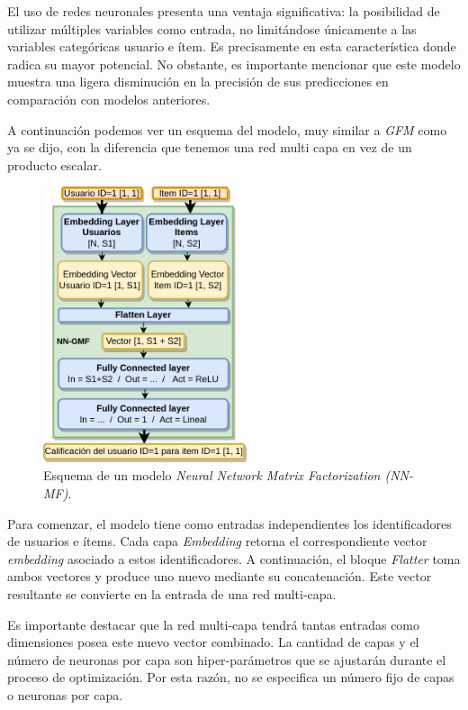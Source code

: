 \documentclass[11pt,a4paper,twoside]{thesis}
\begin{document}
El uso de redes neuronales presenta una ventaja significativa: la posibilidad
de utilizar múltiples variables como entrada, no limitándose únicamente a las
variables categóricas usuario e ítem. Es precisamente en esta característica
donde radica su mayor potencial. No obstante, es importante mencionar que este
modelo muestra una ligera disminución en la precisión de sus predicciones en
comparación con modelos anteriores.

A continuación podemos ver un esquema del modelo, muy similar a \textit{GFM}
como ya se dijo, con la diferencia que tenemos una red multi capa en vez de un
producto escalar.

\begin{figure}[h!]
	\centering
	\includegraphics[width=6cm]{./images/NN-MF.png}

	\caption{
		Esquema de un modelo \textit{Neural Network Matrix Factorization (NN-MF)}.
	}
	\label{fig:NNMFModel}
\end{figure}

Para comenzar, el modelo tiene como entradas independientes los identificadores
de usuarios e ítems. Cada capa \textit{Embedding} retorna el correspondiente
vector \textit{embedding} asociado a estos identificadores. A continuación, el
bloque \textit{Flatter} toma ambos vectores y produce uno nuevo mediante su
concatenación. Este vector resultante se convierte en la entrada de una red
multi-capa.

Es importante destacar que la red multi-capa tendrá tantas entradas como
dimensiones posea este nuevo vector combinado. La cantidad de capas y el número
de neuronas por capa son hiper-parámetros que se ajustarán durante el proceso
de optimización. Por esta razón, no se especifica un número fijo de capas o
neuronas por capa.
\end{document}
